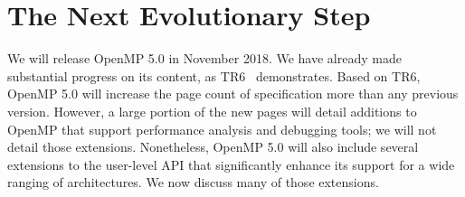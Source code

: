 \section{The Next Evolutionary Step}
\label{sec:in_progress}

We will release OpenMP 5.0 in November 2018. We have already made 
substantial progress on its content, as TR6~\cite{openmptr6} demonstrates.
Based on TR6, OpenMP 5.0 will increase the page count of specification 
more than any previous version. However, a large portion of the new
pages will detail additions to OpenMP that support performance analysis
and debugging tools; we will not detail those extensions. Nonetheless,
OpenMP 5.0 will also include several extensions to the user-level API 
that significantly enhance its support for a wide ranging of architectures.
We now discuss many of those extensions.









   

